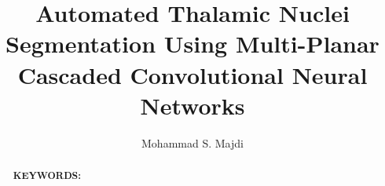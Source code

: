 
\newcommand{\figurepath}[1]{figures/#1}



\title{Automated Thalamic Nuclei Segmentation Using Multi-Planar Cascaded Convolutional Neural Networks}
% 
% 
\author{Mohammad S. Majdi}

\begin{abstract}


\textbf{KEYWORDS:}

\end{abstract}

\maketitle









